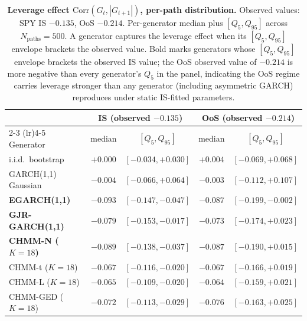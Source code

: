 \begin{table}[!ht]
\centering
\small
\caption{\textbf{Leverage effect $\mathrm{Corr}(G_t, |G_{t+1}|)$, per-path distribution.} Observed values: SPY IS $-0.135$, OoS $-0.214$. Per-generator median plus $[Q_5, Q_{95}]$ across $N_{\text{paths}} = 500$. A generator captures the leverage effect when its $[Q_5, Q_{95}]$ envelope brackets the observed value. Bold marks generators whose $[Q_5, Q_{95}]$ envelope brackets the observed IS value; the OoS observed value of $-0.214$ is more negative than every generator's $Q_5$ in the panel, indicating the OoS regime carries leverage stronger than any generator (including asymmetric GARCH) reproduces under static IS-fitted parameters.}
\label{tab:leverage_effect}
\begin{tabular}{l c c c c}
\toprule
& \multicolumn{2}{c}{IS (observed $-0.135$)} & \multicolumn{2}{c}{OoS (observed $-0.214$)} \\
\cmidrule(lr){2-3} \cmidrule(lr){4-5}
Generator & median & $[Q_5, Q_{95}]$ & median & $[Q_5, Q_{95}]$ \\
\midrule
i.i.d.\ bootstrap          & $+0.000$ & $[-0.034, +0.030]$ & $+0.004$ & $[-0.069, +0.068]$ \\
GARCH(1,1) Gaussian        & $-0.004$ & $[-0.066, +0.064]$ & $-0.003$ & $[-0.112, +0.107]$ \\
\textbf{EGARCH(1,1)}                & $\mathbf{-0.093}$ & $\mathbf{[-0.147, -0.047]}$ & $-0.087$ & $[-0.199, -0.002]$ \\
\textbf{GJR-GARCH(1,1)}             & $\mathbf{-0.079}$ & $\mathbf{[-0.153, -0.017]}$ & $-0.073$ & $[-0.174, +0.023]$ \\
\textbf{CHMM-N ($K = 18$)} & $\mathbf{-0.089}$ & $\mathbf{[-0.138, -0.037]}$ & $-0.087$ & $[-0.190, +0.015]$ \\
CHMM-t ($K = 18$)          & $-0.067$ & $[-0.116, -0.020]$ & $-0.067$ & $[-0.166, +0.019]$ \\
CHMM-L ($K = 18$)          & $-0.065$ & $[-0.109, -0.020]$ & $-0.064$ & $[-0.159, +0.021]$ \\
CHMM-GED ($K = 18$)        & $-0.072$ & $[-0.113, -0.029]$ & $-0.076$ & $[-0.163, +0.025]$ \\
\bottomrule
\end{tabular}
\end{table}


